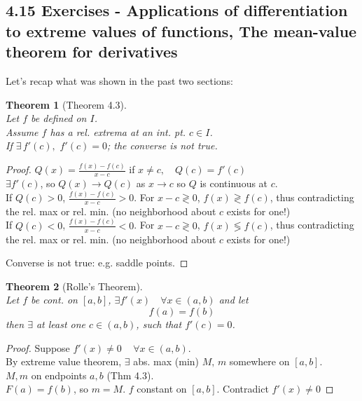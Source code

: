 \documentclass[twoside]{amsart}
\theoremstyle{plain}
\newtheorem{theorem}{Theorem}
\theoremstyle{definition}
\begin{document}
\subsection*{ 4.15 Exercises - Applications of differentiation to extreme values of functions, The mean-value theorem for derivatives }

Let's recap what was shown in the past two sections: 
\begin{theorem}[Theorem 4.3] \quad \\
Let $f$ be defined on $I$.  \\
Assume $f$ has a rel. extrema at an int. pt. $c \in I$.  \\
If $\exists \, f'(c), \, \, f'(c) = 0$; the converse is not true.  
\end{theorem}
\begin{proof}
$  Q(x) = \frac{ f(x) - f(c) }{ x - c} $ if $ x \neq c, \quad Q(c) = f'(c)$ \\
$\exists f'(c)$, so $Q(x) \to Q(c)$ as $x \to c$ so $Q$ is continuous at $c$. \\ 
If $Q(c) > 0$, \quad $\frac{f(x) - f(c)}{ x-c } > 0 $.  For $x - c \gtrless 0$, \quad $f(x) \gtrless f(c)$, thus contradicting the rel. max or rel. min. (no neighborhood about $c$ exists for one!) \\
If $Q(c) < 0$, \quad $\frac{f(x) - f(c)}{ x-c } < 0 $.  For $x - c \gtrless 0$, \quad $f(x) \lessgtr f(c)$, thus contradicting the rel. max or rel. min. (no neighborhood about $c$ exists for one!) 

Converse is not true: e.g. saddle points.
\end{proof}

\begin{theorem}[Rolle's Theorem] \quad \\
Let $f$ be cont. on $[a,b]$, \quad $\exists f'(x) \quad \forall x \in (a,b)$ and let 
\[
f(a)=f(b)
\]
then $\exists$ at least one $c \in (a,b)$, such that $f'(c) = 0$.  
\end{theorem}

\begin{proof}
  Suppose $f'(x) \neq 0 \quad \, \forall x \in (a,b)$.  \\
  By extreme value theorem, $\exists$ abs. max (min) $M, \, m$ somewhere on $[a,b]$.   \\
  $M,m$ on endpoints $a,b$ (Thm 4.3).  \\
  $F(a) = f(b)$, so $m = M$.  $f$ constant on $[a,b]$.  
Contradict $f'(x) \neq 0$
\end{proof}
\end{document}

